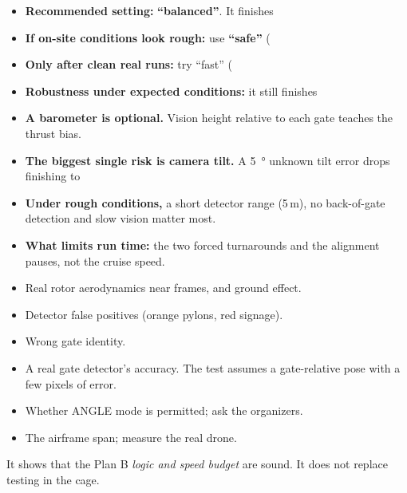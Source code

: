 \begin{verdict}
\begin{itemize}
\item \textbf{Recommended setting:} \textbf{``balanced''}. It finishes %
\item \textbf{If on-site conditions look rough:} use \textbf{``safe''} (%
\item \textbf{Only after clean real runs:} try ``fast'' (%
\item \textbf{Robustness under expected conditions:} it still finishes %
\item \textbf{A barometer is optional.} Vision height relative to each gate teaches the thrust bias.
\item \textbf{The biggest single risk is camera tilt.} A \SI{5}{\degree} unknown tilt error drops finishing to %
\item \textbf{Under rough conditions,} a short detector range (5\,m), no back-of-gate detection and slow vision matter most.
\item \textbf{What limits run time:} the two forced turnarounds and the alignment pauses, not the cruise speed.
\end{itemize}
\end{verdict}

\begin{warnbox}
\begin{itemize}
\item Real rotor aerodynamics near frames, and ground effect.
\item Detector false positives (orange pylons, red signage).
\item Wrong gate identity.
\item A real gate detector's accuracy. The test assumes a gate-relative pose with a few pixels of error.
\item Whether ANGLE mode is permitted; ask the organizers.
\item The airframe span; measure the real drone.
\end{itemize}
It shows that the Plan B \emph{logic and speed budget} are sound. It does not replace testing in the cage.
\end{warnbox}
